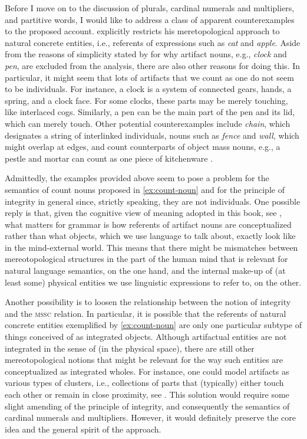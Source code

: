 	Before I move on to the discussion of plurals, cardinal numerals and multipliers, and partitive words, I would like to address a class of apparent counterexamples to the proposed account. \citet[p. 21]{grimm2012number} explicitly restricts his meretopological approach to natural concrete entities, i.e., referents of expressions such as \textit{cat} and \textit{apple}. Aside from the reasons of simplicity stated by \citeauthor{grimm2012number} for why artifact nouns, e.g., \textit{clock} and \textit{pen}, are excluded from the analysis, there are also other reasons for doing this. In particular, it might seem that lots of artifacts that we count as one do not seem to be  individuals. For instance, a clock is a system of connected gears, hands, a spring, and a clock face. For some clocks, these parts may be merely touching, like interlaced cogs. Similarly, a pen can be the main part of the pen and its lid, which can merely touch. Other potential counterexamples include \textit{chain}, which designates a string of interlinked  individuals, nouns such as \textit{fence} and \textit{wall}, which might overlap at edges, and count counterparts of object mass nouns, e.g., a pestle and mortar can count as one piece of kitchenware \citep[see][]{sutton_filip2016counting}. 
	
	Admittedly, the examples provided above seem to pose a problem for the semantics of count nouns proposed in \ref{ex:count-noun} and for the principle of integrity in general since, strictly speaking, they are not  individuals. One possible reply is that, given the cognitive view of meaning adopted in this book, see , what matters for grammar is how referents of artifact nouns are conceptualized rather than what objects, which we use language to talk about, exactly look like in the mind-external world. This means that there might be mismatches between mereotopological structures in the part of the human mind that is relevant for natural language semantics, on the one hand, and the internal make-up of (at least some) physical entities we use linguistic expressions to refer to, on the other. 
	
	Another possibility is to loosen the relationship between the notion of integrity and the \textsc{mssc} relation. In particular, it is possible that the referents of natural concrete entities exemplified by \ref{ex:count-noun} are only one particular subtype of things conceived of as integrated objects. Although artifactual entities are not integrated in the sense of  (in the physical space), there are still other mereotopological notions that might be relevant for the way such entities are conceptualized as integrated wholes. For instance, one could model artifacts as various types of clusters, i.e., collections of parts that (typically) either touch each other or remain in close proximity, see . This solution would require some slight amending of the principle of integrity, and consequently the semantics of cardinal numerals and multipliers. However, it would definitely preserve the core idea and the general spirit of the approach. 
	
